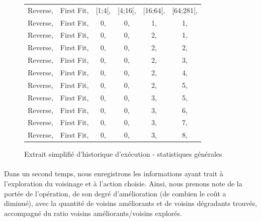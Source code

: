 \documentclass[a4paper,10pt]{report}
\begin{document}
\begin{figure}[h]
  \begin{center}
    \begin{tabular}{cccccc}
      Reverse,&First Fit,&[1;4[,&[4;16[,&[16;64[,&[64;281[,\\
      Reverse,&First Fit,&0,    &0,     &1,      &1,\\
      Reverse,&First Fit,&0,    &0,     &2,      &1,\\
      Reverse,&First Fit,&0,    &0,     &2,      &2,\\
      Reverse,&First Fit,&0,    &0,     &2,      &3,\\
      Reverse,&First Fit,&0,    &0,     &2,      &4,\\
      Reverse,&First Fit,&0,    &0,     &2,      &5,\\
      Reverse,&First Fit,&0,    &0,     &3,      &5,\\
      Reverse,&First Fit,&0,    &0,     &3,      &6,\\
      Reverse,&First Fit,&0,    &0,     &3,      &7,\\
      Reverse,&First Fit,&0,    &0,     &3,      &8,\\
    \end{tabular}
  \end{center}
  \label{a280-sample-interval-simple}
  \caption{Extrait simplifié d'historique d'exécution - statistiques générales}
\end{figure}

\paragraph{}
  Dans un second temps, nous enregistrons les informations ayant trait à
l'exploration du voisinage et à l'action choisie. Ainsi, nous prenons note de
la portée de l'opération, de son degré d'amélioration (de combien le coût a
diminué), avec la quantité de voisins améliorants et de voisins dégradants
trouvés, accompagné du ratio voisins améliorants/voisins explorés.
\end{document}
